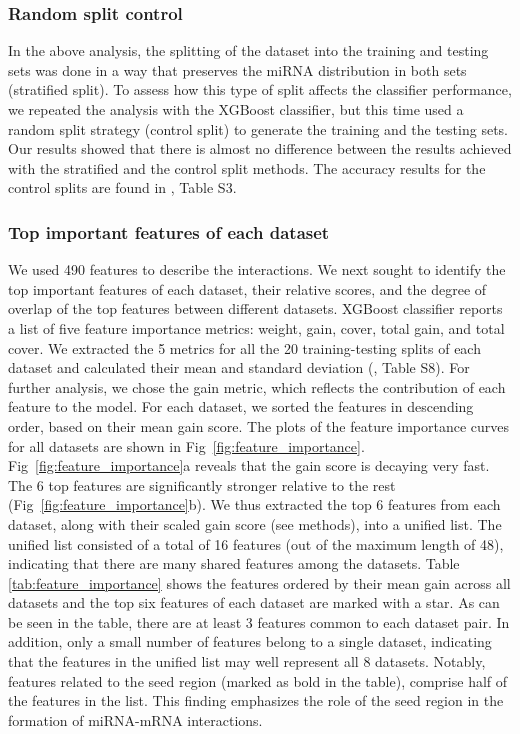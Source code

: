 \documentclass{bmcart}
\begin{document}
\subsubsection*{Random split control}
In the above analysis, the splitting of the dataset into the training and testing sets was done in a way that preserves the miRNA distribution in both sets (stratified split). To assess how this type of split affects the classifier performance, we repeated the analysis with the XGBoost classifier, but this time used a random split strategy (control split) to generate the training and the testing sets. Our results showed that there is almost no difference between the results achieved with the stratified and the control split methods. The accuracy results for the control splits are found in , Table S3.

\subsubsection*{Top important features of each dataset}
We used 490 features to describe the interactions. We next sought to identify the top important features of each dataset, their relative scores, and the degree of overlap of the top features between different datasets. XGBoost classifier reports a list of five feature importance metrics: weight, gain, cover, total gain, and total cover. We extracted the 5 metrics for all the 20 training-testing splits of each dataset and calculated their mean and standard deviation (, Table S8).
For further analysis, we chose the gain metric, which reflects the contribution of each feature to the model. For each dataset, we sorted the features in descending order, based on their mean gain score. The plots of the feature importance curves for all datasets are shown in Fig~\ref{fig:feature_importance}.
Fig~\ref{fig:feature_importance}a reveals that the gain score is decaying very fast. The 6 top features are significantly stronger relative to the rest (Fig~\ref{fig:feature_importance}b). We thus extracted the top 6 features from each dataset, along with their scaled gain score (see methods), into a unified list. The unified list consisted of a total of 16 features (out of the maximum length of 48), indicating that there are many shared features among the datasets. Table \ref{tab:feature_importance} shows the features ordered by their mean gain across all datasets and the top six features of each dataset are marked with a star. As can be seen in the table, there are at least 3 features common to each dataset pair. In addition, only a small number of features belong to a single dataset, indicating that the features in the unified list may well represent all 8 datasets.
Notably, features related to the seed region (marked as bold in the table), comprise half of the features in the list. This finding emphasizes the role of the seed region in the formation of miRNA-mRNA interactions.
\end{document}
